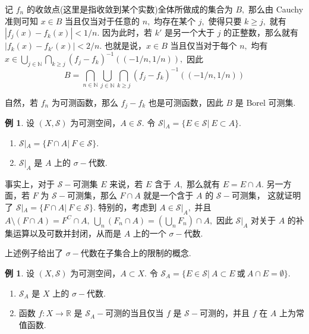 \documentclass[12pt, a4paper, oneside]{book}
\numberwithin{figure}{section}
\theoremstyle{definition}
\newtheorem{example}[theorem]{例}
\begin{document}
记 $f_n$ 的收敛点(这里是指收敛到某个实数)全体所做成的集合为 $B,$ 那么由 Cauchy 准则可知 $x\in B$ 当且仅当对于任意的 $n,$ 均存在某个 $j,$ 使得只要 $k\geq j,$ 就有 $|f_j(x)-f_k(x)|<1/n.$ 因为此时，若 $k'$ 是另一个大于 $j$ 的正整数，那么就有 $|f_k(x)-f_{k'}(x)|<2/n.$
也就是说，$x\in B$ 当且仅当对于每个 $n,$ 均有 $x\in \bigcup_{j\in\mathbb N}\bigcap_{k\geq j} (f_j-f_k)^{-1}((-1/n,1/n)),$ 因此
\begin{equation}
    B=\bigcap_{n\in\mathbb N}\bigcup_{j\in\mathbb N}\bigcap_{k\geq j} (f_j-f_k)^{-1}((-1/n,1/n))
\end{equation}

自然，若 $f_n$ 为可测函数，那么 $f_j-f_k$ 也是可测函数，因此 $B$ 是 Borel 可测集. 


\begin{example}\label{ex:sigma_algebra_restriction}
    设 $(X,\mathcal S)$ 为可测空间，$A\in\mathcal S.$ 令 $\mathcal S|_A=\{E\in\mathcal S|\ E\subset A\}.$
    \begin{enumerate}[label=\alph*)]
        \item $\mathcal S|_A=\{F\cap A|\ F\in\mathcal S\}.$
        \item $\mathcal S|_A$ 是 $A$ 上的 $\sigma-$代数.
    \end{enumerate}
\end{example}
事实上，对于 $\mathcal S-$可测集 $E$ 来说，若 $E$ 含于 $A,$ 那么就有 $E=E\cap A.$ 另一方面，若 $F$ 为 $\mathcal S-$可测集，那么 $F\cap A$ 就是一个含于 $A$ 的 $\mathcal S-$可测集，
这就证明了 $\mathcal S|_A=\{F\cap A|\ F\in\mathcal S\}.$ 特别的，考虑到 $A\in \mathcal S|_A,$ 并且 $A\setminus(F\cap A)=F^C\cap A,\ \bigcup_n(F_n\cap A)=(\bigcup_n F_n)\cap A,$ 因此 $\mathcal S|_A$ 对关于 $A$ 的补集运算以及可数并封闭，从而是 $A$ 上的一个 $\sigma-$代数.


上述例子给出了 $\sigma-$代数在子集合上的限制的概念.


\begin{example}\label{ex:sigma_algebra_frozen_restriction}
    设 $(X,\mathcal S)$ 为可测空间，$A\subset X.$ 令 $\mathcal S_A=\{E\in\mathcal S|\ A\subset E\ \text{或}\ A\cap E=\emptyset\}.$
    \begin{enumerate}[label=\alph*)]
        \item $\mathcal S_A$ 是 $X$ 上的 $\sigma-$代数.
        \item 函数 $f:X\to \mathbb R$ 是 $\mathcal S_A-$可测的当且仅当 $f$ 是 $\mathcal S-$可测的，并且 $f$ 在 $A$ 上为常值函数.
    \end{enumerate}
\end{example}
\end{document}
